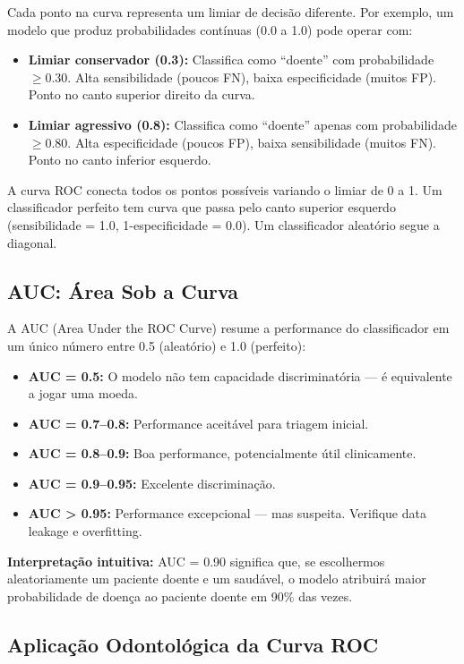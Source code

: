 Cada ponto na curva representa um limiar de decisão diferente. Por exemplo, um modelo que produz probabilidades contínuas (0.0 a 1.0) pode operar com:
\begin{itemize}
    \item \textbf{Limiar conservador (0.3):} Classifica como ``doente'' com probabilidade $\geq 0.30$. Alta sensibilidade (poucos FN), baixa especificidade (muitos FP). Ponto no canto superior direito da curva.
    \item \textbf{Limiar agressivo (0.8):} Classifica como ``doente'' apenas com probabilidade $\geq 0.80$. Alta especificidade (poucos FP), baixa sensibilidade (muitos FN). Ponto no canto inferior esquerdo.
\end{itemize}

A curva ROC conecta todos os pontos possíveis variando o limiar de 0 a 1. Um classificador perfeito tem curva que passa pelo canto superior esquerdo (sensibilidade = 1.0, 1-especificidade = 0.0). Um classificador aleatório segue a diagonal.

\subsection{AUC: Área Sob a Curva}

A AUC (Area Under the ROC Curve)  resume a performance do classificador em um único número entre 0.5 (aleatório) e 1.0 (perfeito):

\begin{itemize}
    \item \textbf{AUC = 0.5:} O modelo não tem capacidade discriminatória — é equivalente a jogar uma moeda.
    \item \textbf{AUC = 0.7--0.8:} Performance aceitável para triagem inicial.
    \item \textbf{AUC = 0.8--0.9:} Boa performance, potencialmente útil clinicamente.
    \item \textbf{AUC = 0.9--0.95:} Excelente discriminação.
    \item \textbf{AUC > 0.95:} Performance excepcional — mas suspeita. Verifique data leakage e overfitting.
\end{itemize}

\textbf{Interpretação intuitiva:} AUC = 0.90 significa que, se escolhermos aleatoriamente um paciente doente e um saudável, o modelo atribuirá maior probabilidade de doença ao paciente doente em 90\% das vezes.

\subsection{Aplicação Odontológica da Curva ROC}

